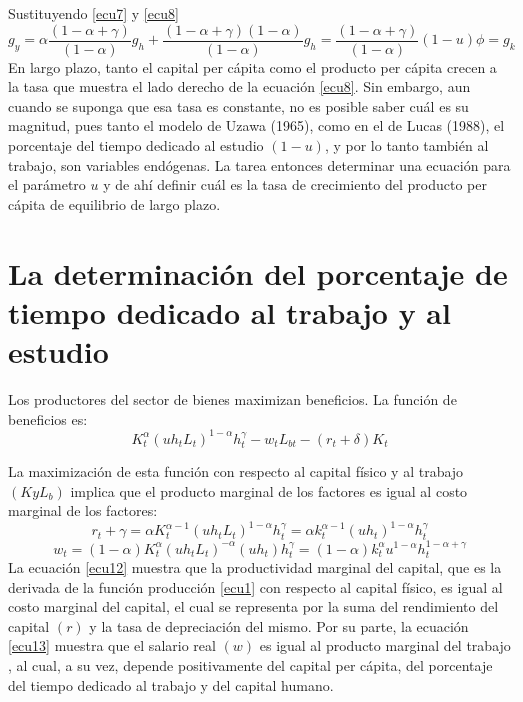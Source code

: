 \documentclass[12pt,notitlepage]{report}
\begin{document}
	Sustituyendo \ref{ecu7} y \ref{ecu8}
	\begin{equation}\label{ecu10}
		g_y=\alpha\frac{(1-\alpha +\gamma)}{(1-\alpha)}g_h + \frac{(1-\alpha + \gamma)(1-\alpha)}{(1-\alpha)}g_h=\frac{(1-\alpha + \gamma)}{(1-\alpha)}(1-u)\phi=g_k
	\end{equation}
	En largo plazo, tanto el capital per cápita como el producto per cápita crecen a la tasa que muestra el lado derecho de la ecuación \ref{ecu8}. Sin embargo, aun cuando se suponga que esa tasa es constante, no es posible saber cuál es su magnitud, pues tanto el modelo de Uzawa (1965), como en el de Lucas (1988), el porcentaje del tiempo dedicado al estudio $(1-u)$, y por lo tanto también al trabajo, son variables endógenas. La tarea entonces determinar una ecuación para el parámetro $u$ y de ahí definir cuál es la tasa de crecimiento del producto per cápita de equilibrio de largo plazo.
	
	\chapter{La determinación del porcentaje de tiempo dedicado al trabajo y al estudio} 
	Los productores del sector de bienes maximizan beneficios. La función de beneficios es:
	\begin{equation}\label{ecu11}
		K_t^\alpha (uh_tL_t)^{1-\alpha}h_t^\gamma -w_tL_{bt}-(r_t + \delta)K_t
	\end{equation}
	
	La maximización de esta función con respecto al capital físico y al trabajo $(KyL_b)$ implica que el producto marginal de los factores es igual al costo marginal de los factores:
	\begin{equation}\label{ecu12}
		r_t + \gamma=\alpha K_t^{\alpha -1}(uh_tL_t)^{1-\alpha}h_t^\gamma=\alpha k_t^{\alpha -1}(uh_t)^{1-\alpha}h_t^\gamma
	\end{equation}
	\begin{equation}\label{ecu13}
		w_t=(1-\alpha)K_t^\alpha(uh_tL_t)^{-\alpha}(uh_t)h_t^\gamma=(1-\alpha)k_t^\alpha u^{1-\alpha}h_t^{1-\alpha+\gamma}
	\end{equation}
	La ecuación \ref{ecu12} muestra que la productividad marginal del capital, que es la derivada de la función producción \ref{ecu1} con respecto al capital físico, es igual al costo marginal del capital, el cual se representa por la suma del rendimiento del capital $(r)$ y la tasa de depreciación del mismo. Por su parte, la ecuación \ref{ecu13} muestra que el salario real $(w)$ es igual al producto marginal del trabajo , al cual, a su vez, depende positivamente del capital per cápita, del porcentaje del tiempo dedicado al trabajo y del capital humano.
	
\end{document}
